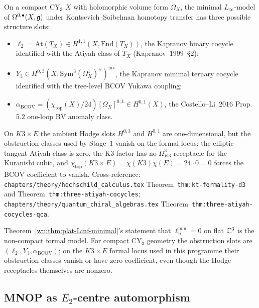 \begin{theorem}\ClaimStatusCorrected
\label{wn:thm:plat-three-atiyah-cocycles}
On a compact CY$_3$ $X$ with holomorphic volume form $\Omega_X$, the minimal
$L_\infty$-model of $\Omega^{0,\bullet}(X, \mathfrak{g})$ under Kontsevich--Soibelman
homotopy transfer has three possible structure slots:
\begin{itemize}
\item $\ell_2 = \mathrm{At}(T_X) \in H^{1,1}(X, \mathrm{End}(T_X))$, the
Kapranov binary cocycle identified with the Atiyah class of $T_X$
(Kapranov~$1999$~\S$2$);
\item $Y_3 \in H^{0,3}(X, \mathrm{Sym}^3(\Omega^1_X)^\vee)^{\mathrm{inv}}$,
the Kapranov minimal ternary cocycle identified with the tree-level BCOV
Yukawa coupling;
\item $\alpha_{\mathrm{BCOV}} = (\chi_{\mathrm{top}}(X)/24)[\Omega_X]^{0,1}
\in H^{0,1}(X)$, the Costello--Li~$2016$ Prop.~$5.2$ one-loop BV anomaly
class.
\end{itemize}
On $K3 \times E$ the ambient Hodge slots $H^{0,3}$ and $H^{0,1}$ are
one-dimensional, but the obstruction classes used by Stage~$1$ vanish on
the formal locus: the elliptic tangent Atiyah class is zero, the K3
factor has no $\Omega^3_{K3}$ receptacle for the Kuranishi cubic, and
$\chi_{\mathrm{top}}(K3 \times E)=\chi(K3)\chi(E)=24\cdot0=0$ forces the
BCOV coefficient to vanish. Cross-reference:
\texttt{chapters/theory/hochschild\_calculus.tex} Theorem~\texttt{thm:kt-formality-d3}
and Theorem~\texttt{thm:three-atiyah-cocycles};
\texttt{chapters/theory/quantum\_chiral\_algebras.tex}
Theorem~\texttt{thm:three-atiyah-cocycles-qca}.
\end{theorem}

\begin{remark}
\label{wn:rmk:plat-formality-witness}
Theorem~\ref{wn:thm:plat-Linf-minimal}'s statement that $\ell_n^{\min}=0$
on flat $\mathbb{C}^3$ is the non-compact formal model.  For compact CY$_3$
geometry the obstruction slots are $(\ell_2,Y_3,\alpha_{\mathrm{BCOV}})$;
on the $K3\times E$ formal locus used in this programme their obstruction
classes vanish or have zero coefficient, even though the Hodge receptacles
themselves are nonzero.
\end{remark}

\subsection{MNOP as $E_2$-centre automorphism}
\label{wn:subsec:plat-mnop-e2-centre}

